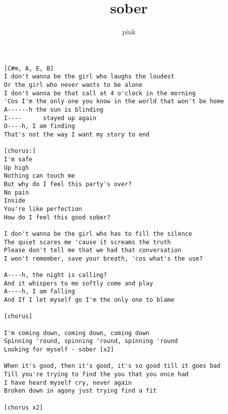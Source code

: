 \author{pink}
\title{sober}
\maketitle
\begin{verbatim}
[C#m, A, E, B]
I don't wanna be the girl who laughs the loudest
Or the girl who never wants to be alone
I don't wanna be that call at 4 o'clock in the morning
'Cos I'm the only one you know in the world that won't be home
A------h the sun is blinding
I----      stayed up again
O----h, I am finding
That's not the way I want my story to end

[chorus:]
I'm safe
Up high
Nothing can touch me
But why do I feel this party's over?
No pain
Inside
You're like perfection
How do I feel this good sober?

I don't wanna be the girl who has to fill the silence
The quiet scares me 'cause it screams the truth
Please don't tell me that we had that conversation
I won't remember, save your breath, 'cos what's the use?

A----h, the night is calling?
And it whispers to me softly come and play
A----h, I am falling
And If I let myself go I'm the only one to blame 

[chorus]

I'm coming down, coming down, coming down
Spinning 'round, spinning 'round, spinning 'round
Looking for myself - sober [x2]

When it's good, then it's good, it's so good till it goes bad
Till you're trying to find the you that you once had
I have heard myself cry, never again
Broken down in agony just trying find a fit

[chorus x2]
\end{verbatim}
